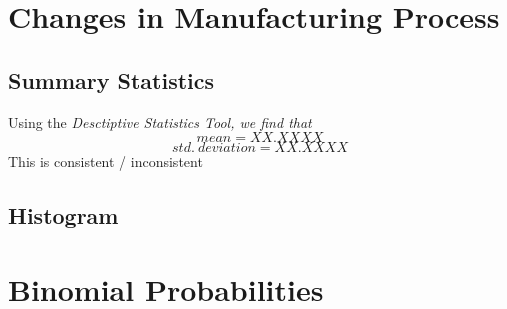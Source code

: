 \documentclass[letterpaper]{article}
\begin{document}
\section{Changes in Manufacturing Process}%

\subsection{Summary Statistics} %
Using the \textit{Desctiptive Statistics Tool, we find that}
$${mean} = XX.XXXX$$
$${std.\ deviation} = XX.XXXX$$
This is consistent / inconsistent

\subsection{Histogram}

\subsection{} %

\subsection{} %

\section{Binomial Probabilities}

\subsection{} %

\subsection{} %
\end{document}
